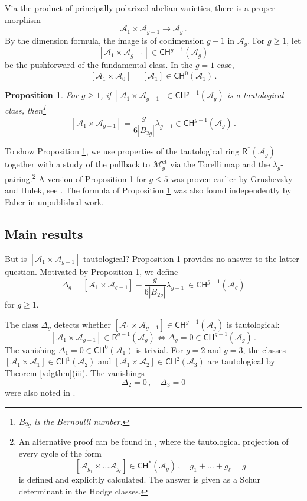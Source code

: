 \documentclass[11pt]{amsart}
\newtheorem{prop}[thm]{Proposition}
\theoremstyle{definition}
\newcommand{\R}{\mathsf{R}}
\newcommand{\A}{\mathcal{A}}
\newcommand{\CH}{\mathsf{CH}}
\begin{document}
Via the product of principally polarized abelian
varieties, there is a proper morphism
$$\mathcal{A}_1 \times \mathcal{A}_{g-1}\rightarrow \mathcal{A}_g\, .$$
By the dimension formula, the image is of
codimension $g-1$ in $\mathcal{A}_g$.
For $g\geq 1$,
let $$[\mathcal{A}_1\times \mathcal{A}_{g-1}]\in \mathsf{CH}^{g-1}(\mathcal{A}_g)$$ be the pushforward
of the fundamental class. In the $g=1$  case, 
$$[\A_1\times \A_0]=[\A_1] \in \mathsf{CH}^0(\A_1)\,.$$


\begin{prop}\label{tautprop} For $g\geq 1$,
if $[\mathcal{A}_1\times \mathcal{A}_{g-1}] \in
\mathsf{CH}^{g-1}(\mathcal{A}_g)$ is
a tautological class, then{\footnote{$B_{2g}$ is the Bernoulli number.}}
$$[\mathcal{A}_1\times \mathcal{A}_{g-1}]=\frac{g}{6|B_{2g}|}\lambda_{g-1} \in 
\mathsf{CH}^{g-1}(\mathcal{A}_g)\, .$$
\end{prop}


To show Proposition \ref{tautprop}, we
use properties of the tautological ring 
$\mathsf{R}^*(\mathcal{A}_g)$ together
with a study of
the pullback to $\mathcal{M}_g^{\mathrm{ct}}$
via the Torelli map and the $\lambda_g$-pairing.\footnote {An alternative proof can be found in \cite {CMOP}, where the tautological projection of every cycle of the form $$[\A_{g_1}\times \ldots \A_{g_\ell}]\in \CH^*(\A_g)\,, \quad g_1+\ldots+g_\ell=g$$ is defined and explicitly calculated. The answer is given as a Schur determinant in the Hodge classes.} A version of Proposition \ref{tautprop} for $g\leq 5$ was proven earlier by Grushevsky and Hulek, see \cite[Lemma 8.1, Proposition 9.3]{GH}. The formula of Proposition \ref{tautprop}
was also found independently by Faber in unpublished work.



\subsection{Main results} \label{mainr}
But is $[\mathcal{A}_1\times \mathcal{A}_{g-1}]$
tautological?
Proposition
\ref{tautprop} provides no answer to the
latter question.
Motivated by Proposition \ref{tautprop},
we define
   $$\Delta_g=[\mathcal A_1\times \mathcal A_{g-1}]-\frac{g}{6|B_{2g}|}\lambda_{g-1}\ \in  \CH^{g-1}(\A_g)$$
for $g\geq 1$.


The class $\Delta_g$ detects
whether $[\mathcal{A}_1\times\mathcal{A}_{g-1}]\in \CH^{g-1}(\A_g)$ is
tautological: 
$$
[\A_1\times \A_{g-1}]\in \R^{g-1}(\A_g) \iff 
\Delta_g=0 \in
\CH^{g-1}(\A_g)
\, .$$
The vanishing $\Delta_1=0\in \mathsf{CH}^0(\A_1)$
is trivial. For $g=2$ and $g=3$, the classes $[\A_1\times \A_1] \in \CH^1(\A_2)$ and $[\A_1\times \A_2]\in \CH^2(\A_3)$ are tautological by Theorem \ref{vdgthm}(iii). The vanishings $$\Delta_2=0\, , \quad \Delta_3=0$$ were also noted in \cite [Lemma 2.2, Proposition 2.1]{vdg2}. 
\end{document}
